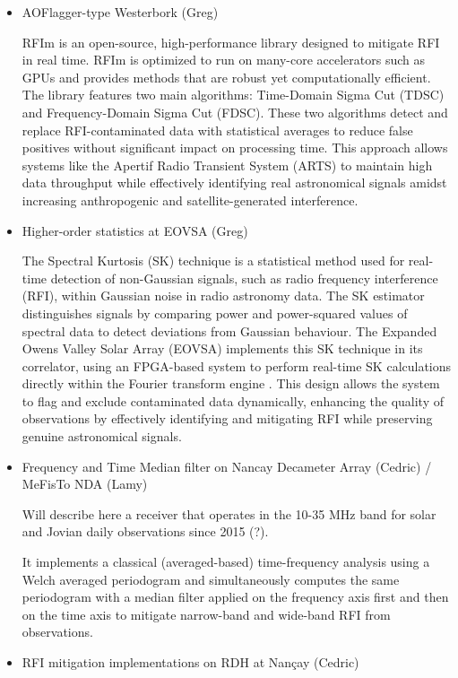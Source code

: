 \begin{itemize}
\item AOFlagger-type Westerbork (Greg)

 RFIm \cite{sclocco2019real} is an open-source, high-performance library designed to mitigate RFI in real time. RFIm is optimized to run on many-core accelerators such as GPUs and provides methods that are robust yet computationally efficient. The library features two main algorithms: Time-Domain Sigma Cut (TDSC) and Frequency-Domain Sigma Cut (FDSC). These two algorithms detect and replace RFI-contaminated data with statistical averages to reduce false positives without significant impact on processing time. This approach allows systems like the Apertif Radio Transient System (ARTS) to maintain high data throughput while effectively identifying real astronomical signals amidst increasing anthropogenic and satellite-generated interference.
 
\item Higher-order statistics at EOVSA (Greg)

The Spectral Kurtosis (SK) technique is a statistical method used for real-time detection of non-Gaussian signals, such as radio frequency interference (RFI), within Gaussian noise in radio astronomy data. The SK estimator distinguishes signals by comparing power and power-squared values of spectral data to detect deviations from Gaussian behaviour. The Expanded Owens Valley Solar Array (EOVSA) implements this SK technique in its correlator, using an FPGA-based system to perform real-time SK calculations directly within the Fourier transform engine \cite{}. This design allows the system to flag and exclude contaminated data dynamically, enhancing the quality of observations by effectively identifying and mitigating RFI while preserving genuine astronomical signals.

\item Frequency and Time Median filter on Nancay Decameter Array (Cedric) / MeFisTo NDA (Lamy)

Will describe here a receiver that operates in the 10-35 MHz band for solar and Jovian daily observations since 2015 (?).

It implements a classical (averaged-based) time-frequency analysis using a Welch averaged periodogram and simultaneously computes the same periodogram with a median filter applied on the frequency axis first and then on the time axis to mitigate narrow-band and wide-band RFI from observations.

\item RFI mitigation implementations on RDH at Nançay (Cedric)


\end{itemize}
